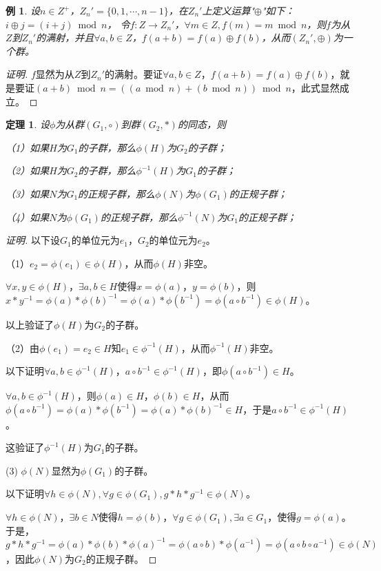 \documentclass{article}
\newtheorem{Thm}{定理}
\newtheorem*{Example}{例}
\begin{document}
\begin{CJK*}{UTF8}{gbsn}
\begin{Example}
  设$n\in Z^+$，$Z_n'=\{0,1,\cdots, n-1\}$，在$Z_n'$上定义运算"$\oplus$"如下：$i\oplus j=(i+j)\bmod n$，
  令$f:Z\to Z_n'$，$\forall m\in Z, f(m)= m \bmod n$，则$f$为从$Z$到$Z_n'$的满射，并且$\forall a,b\in Z$，$f(a+b)=f(a)\oplus f(b)$，从而$(Z_n',\oplus)$为一个群。
\end{Example}
\begin{proof}[证明]
  $f$显然为从$Z$到$Z_n'$的满射。要证$\forall a,b\in Z$，$f(a+b)=f(a)\oplus f(b)$，就是要证$(a+b)\bmod n = ((a\bmod n) + (b\bmod n))\bmod n$，此式显然成立。
\end{proof}
\begin{Thm}
  设$\phi$为从群$(G_1,\circ)$到群$(G_2,*)$的同态，则

  （1）如果$H$为$G_1$的子群，那么$\phi(H)$为$G_2$的子群；

  （2）如果$H$为$G_2$的子群，那么$\phi^{-1}(H)$为$G_1$的子群；

  （3）如果$N$为$G_1$的正规子群，那么$\phi(N)$为$\phi(G_1)$的正规子群；

  （4）如果$N$为$\phi(G_1)$的正规子群，那么$\phi^{-1}(N)$为$G_1$的正规子群；
\end{Thm}
\begin{proof}[证明]
  以下设$G_1$的单位元为$e_1$，$G_2$的单位元为$e_2$。

  （1）$e_2=\phi(e_1)\in \phi(H)$，从而$\phi(H)$非空。

  $\forall x, y\in \phi(H)$，$\exists a,b\in H$使得$x=\phi(a)$，$y=\phi(b)$，则$x*y^{-1}=\phi(a)*\phi(b)^{-1}=\phi(a)*\phi(b^{-1})=\phi(a\circ b^{-1})\in \phi(H)$。

  以上验证了$\phi(H)$为$G_2$的子群。

  （2）由$\phi(e_1)=e_2\in H$知$e_1\in \phi^{-1}(H)$，从而$\phi^{-1}(H)$非空。

  以下证明$\forall a,b\in \phi^{-1}(H)$，$a\circ b^{-1}\in \phi^{-1}(H)$，即$\phi(a\circ b^{-1})\in H$。
  
  $\forall a,b\in \phi^{-1}(H)$，则$\phi(a)\in H$，$\phi(b)\in H$，从而$\phi(a\circ b^{-1})=\phi(a)*\phi(b^{-1})=\phi(a)*\phi(b)^{-1}\in H$，于是$a\circ b^{-1}\in \phi^{-1}(H)$。

  这验证了$\phi^{-1}(H)$为$G_1$的子群。

  (3) $\phi(N)$显然为$\phi(G_1)$的子群。

  以下证明$\forall h\in \phi(N), \forall g\in \phi(G_1), g*h*g^{-1}\in \phi(N)$。

  $\forall h\in \phi(N)$，$\exists b\in N$使得$h=\phi(b)$，$\forall g\in \phi(G_1),\exists a\in G_1$，使得$g=\phi(a)$。于是，$g*h*g^{-1}=\phi(a)*\phi(b)*\phi(a)^{-1}=\phi(a\circ b)*\phi(a^{-1})=\phi(a\circ b\circ a^{-1})\in \phi(N)$，因此$\phi(N)$为$G_2$的正规子群。


\end{proof}
\end{CJK*}
\end{document}

